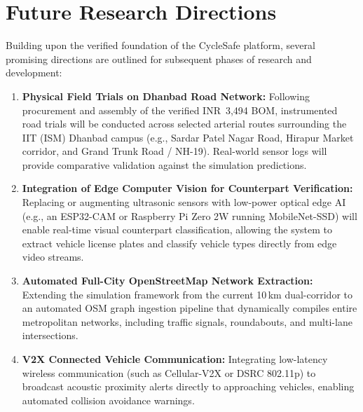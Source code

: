 \section{Future Research Directions}
Building upon the verified foundation of the CycleSafe platform, several promising directions are outlined for subsequent phases of research and development:
\begin{enumerate}
    \item \textbf{Physical Field Trials on Dhanbad Road Network:} Following procurement and assembly of the verified INR~3,494 BOM, instrumented road trials will be conducted across selected arterial routes surrounding the IIT (ISM) Dhanbad campus (e.g., Sardar Patel Nagar Road, Hirapur Market corridor, and Grand Trunk Road / NH-19). Real-world sensor logs will provide comparative validation against the simulation predictions.
    \item \textbf{Integration of Edge Computer Vision for Counterpart Verification:} Replacing or augmenting ultrasonic sensors with low-power optical edge AI (e.g., an ESP32-CAM or Raspberry Pi Zero 2W running MobileNet-SSD) will enable real-time visual counterpart classification, allowing the system to extract vehicle license plates and classify vehicle types directly from edge video streams.
    \item \textbf{Automated Full-City OpenStreetMap Network Extraction:} Extending the simulation framework from the current 10\,km dual-corridor to an automated OSM graph ingestion pipeline that dynamically compiles entire metropolitan networks, including traffic signals, roundabouts, and multi-lane intersections.
    \item \textbf{V2X Connected Vehicle Communication:} Integrating low-latency wireless communication (such as Cellular-V2X or DSRC 802.11p) to broadcast acoustic proximity alerts directly to approaching vehicles, enabling automated collision avoidance warnings.
\end{enumerate}

